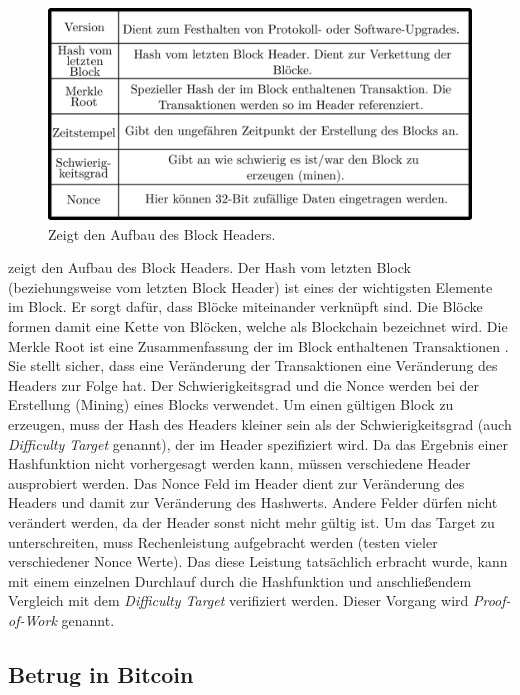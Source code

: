 \documentclass[ngerman,runningheads,a4paper]{llncs}[2018/03/10]
\begin{document}
\begin{figure}
  \centering
  \includegraphics[width=.8\textwidth]{grafiken/tableBlock.png}
  \caption{Zeigt den Aufbau des Block Headers.}
  \label{fig:blockTable}
\end{figure}

 zeigt den Aufbau des Block Headers. Der Hash vom letzten Block (beziehungsweise vom letzten Block Header) ist eines der wichtigsten Elemente im Block. Er sorgt dafür, dass Blöcke miteinander verknüpft sind. Die Blöcke formen damit eine Kette von Blöcken, welche als Blockchain bezeichnet wird. Die Merkle Root ist eine Zusammenfassung der im Block enthaltenen Transaktionen \citep{bitcoinbook}. Sie stellt sicher, dass eine Veränderung der Transaktionen eine Veränderung des Headers zur Folge hat. Der Schwierigkeitsgrad und die Nonce werden bei der Erstellung (Mining) eines Blocks verwendet. Um einen gültigen Block zu erzeugen, muss der Hash des Headers kleiner sein als der Schwierigkeitsgrad (auch \textit{Difficulty Target} genannt), der im Header spezifiziert wird. Da das Ergebnis einer Hashfunktion nicht vorhergesagt werden kann, müssen verschiedene Header ausprobiert werden. Das Nonce Feld im Header dient zur Veränderung des Headers und damit zur Veränderung des Hashwerts. Andere Felder dürfen nicht verändert werden, da der Header sonst nicht mehr gültig ist. Um das Target zu unterschreiten, muss Rechenleistung aufgebracht werden (testen vieler verschiedener Nonce Werte). Das diese Leistung tatsächlich erbracht wurde, kann mit einem einzelnen Durchlauf durch die Hashfunktion und anschließendem Vergleich mit dem \textit{Difficulty Target} verifiziert werden. Dieser Vorgang wird \textit{Proof-of-Work} genannt.

\subsection{Betrug in Bitcoin}\label{sec:betrug}
\end{document}
